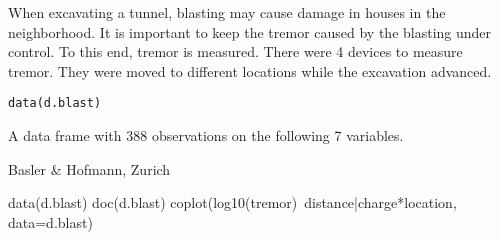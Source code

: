 \documentclass{article}
\begin{document}
\begin{Description}\relax
When excavating a tunnel, blasting may cause damage in houses 
in the neighborhood. It is important to keep the tremor caused by the
blasting under control. To this end, tremor is measured.
There were 4 devices to measure tremor. They were moved to different
locations while the excavation advanced.
\end{Description}
\begin{Usage}
\begin{verbatim}data(d.blast)\end{verbatim}
\end{Usage}
\begin{Format}\relax
A data frame with 388 observations on the following 7 variables.
\end{Format}
\begin{Source}\relax
Basler \& Hofmann, Zurich
\end{Source}
\begin{Examples}
\begin{ExampleCode}
data(d.blast)
doc(d.blast)
coplot(log10(tremor)~distance|charge*location, data=d.blast)
\end{ExampleCode}
\end{Examples}
\end{document}
